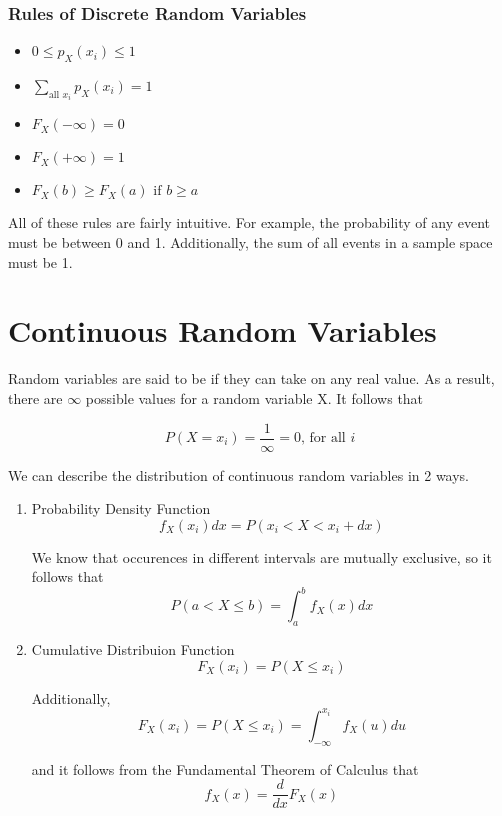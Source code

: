 \subsubsection*{Rules of Discrete Random Variables}
\begin{itemize}
    \item $0 \le p_X(x_i) \le 1$
    \item $\sum_{\text{all } x_i} p_X(x_i) = 1$
    \item $F_X(-\infty) = 0$
    \item $F_X(+\infty) = 1$
    \item $F_X(b) \ge F_X(a) \text{ if } b \ge a$
\end{itemize}
All of these rules are fairly intuitive. For example, the probability of any event must be between 0 and 1. Additionally, the sum of all events in a sample space must be 1. 

\section{Continuous Random Variables}
Random variables are said to be  if they can take on any real value. As a result, there are $\infty$ possible values for a random variable X. It follows that

\[
    P(X = x_i) = \frac{1}{\infty} = 0 \text{, for all } i
\]

We can describe the distribution of continuous random variables in 2 ways.
\begin{enumerate}
    \item Probability Density Function
    \[ 
        f_X(x_i)dx = P(x_i < X < x_i + dx)
    \]
    \begin{center}
    \end{center}

    We know that occurences in different intervals are mutually exclusive, so it follows that
    \[
        P(a < X \le b) = \int_a^bf_X(x)dx
    \]
    \item Cumulative Distribuion Function
    \[
        F_X(x_i) = P(X \le x_i)  
    \]
    \begin{center}
    \end{center}
    Additionally,
    \[
        F_X(x_i) = P(X \le x_i) = \int_{-\infty}^{x_i} f_X(u)du
    \]

    and it follows from the Fundamental Theorem of Calculus that
    \[
        f_X(x) = \frac{d}{dx}F_X(x)
    \]
\end{enumerate}

